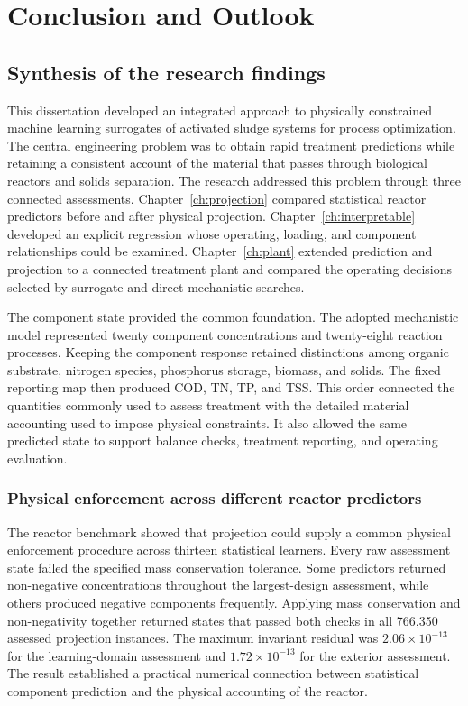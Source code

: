 \chapter{Conclusion and Outlook}
\label{ch:conclusion}

\section{Synthesis of the research findings}
\label{sec:assessment_observed_findings}

This dissertation developed an integrated approach to physically constrained machine learning surrogates of activated sludge systems for process optimization. The central engineering problem was to obtain rapid treatment predictions while retaining a consistent account of the material that passes through biological reactors and solids separation. The research addressed this problem through three connected assessments. Chapter~\ref{ch:projection} compared statistical reactor predictors before and after physical projection. Chapter~\ref{ch:interpretable} developed an explicit regression whose operating, loading, and component relationships could be examined. Chapter~\ref{ch:plant} extended prediction and projection to a connected treatment plant and compared the operating decisions selected by surrogate and direct mechanistic searches.

The component state provided the common foundation. The adopted mechanistic model represented twenty component concentrations and twenty-eight reaction processes. Keeping the component response retained distinctions among organic substrate, nitrogen species, phosphorus storage, biomass, and solids. The fixed reporting map then produced COD, TN, TP, and TSS. This order connected the quantities commonly used to assess treatment with the detailed material accounting used to impose physical constraints. It also allowed the same predicted state to support balance checks, treatment reporting, and operating evaluation.

\subsection{Physical enforcement across different reactor predictors}

The reactor benchmark showed that projection could supply a common physical enforcement procedure across thirteen statistical learners. Every raw assessment state failed the specified mass conservation tolerance. Some predictors returned non-negative concentrations throughout the largest-design assessment, while others produced negative components frequently. Applying mass conservation and non-negativity together returned states that passed both checks in all 766,350 assessed projection instances. The maximum invariant residual was $2.06\times10^{-13}$ for the learning-domain assessment and $1.72\times10^{-13}$ for the exterior assessment. The result established a practical numerical connection between statistical component prediction and the physical accounting of the reactor.

